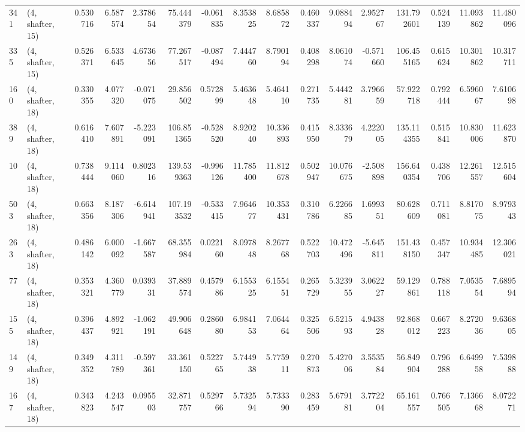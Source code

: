 \begin{tabular}{llrrrrrrrrrrrrrr}
341 &  (4, shafter, 15) &   0.530716 &   6.587574 &   2.378654 &    75.444379 &  -0.061835 &   8.353825 &   8.685872 &  0.460337 &   9.088494 &   2.952767 &   131.792601 &  0.524139 &  11.093862 &  11.480096 \\
335 &  (4, shafter, 15) &   0.526371 &   6.533645 &   4.673656 &    77.267517 &  -0.087494 &   7.444760 &   8.790194 &  0.408298 &   8.061074 &  -0.571660 &   106.455165 &  0.615624 &  10.301862 &  10.317711 \\
160 &  (4, shafter, 18) &   0.330355 &   4.077320 &  -0.071075 &    29.856502 &   0.572899 &   5.463648 &   5.464110 &  0.271735 &   5.444281 &   3.796659 &    57.922718 &  0.792444 &   6.596067 &   7.610698 \\
389 &  (4, shafter, 18) &   0.616410 &   7.607891 &  -5.223091 &   106.851365 &  -0.528520 &   8.920240 &  10.336893 &  0.415950 &   8.333679 &   4.222005 &   135.114355 &  0.515841 &  10.830006 &  11.623870 \\
10  &  (4, shafter, 18) &   0.738444 &   9.114060 &   0.802316 &   139.539363 &  -0.996126 &  11.785400 &  11.812678 &  0.502947 &  10.076675 &  -2.508898 &   156.640354 &  0.438706 &  12.261557 &  12.515604 \\
503 &  (4, shafter, 18) &   0.663356 &   8.187306 &  -6.614941 &   107.193532 &  -0.533415 &   7.964677 &  10.353431 &  0.310786 &   6.226685 &   1.699351 &    80.628609 &  0.711081 &   8.817075 &   8.979343 \\
263 &  (4, shafter, 18) &   0.486142 &   6.000092 &  -1.667587 &    68.355984 &   0.022160 &   8.097848 &   8.267768 &  0.522703 &  10.472496 &  -5.645811 &   151.438150 &  0.457347 &  10.934485 &  12.306021 \\
77  &  (4, shafter, 18) &   0.353321 &   4.360779 &   0.039331 &    37.889574 &   0.457986 &   6.155325 &   6.155451 &  0.265729 &   5.323955 &   3.062227 &    59.129861 &  0.788118 &   7.053554 &   7.689594 \\
155 &  (4, shafter, 18) &   0.396437 &   4.892921 &  -1.062191 &    49.906648 &   0.286080 &   6.984153 &   7.064464 &  0.325506 &   6.521593 &   4.943828 &    92.868012 &  0.667223 &   8.272036 &   9.636805 \\
149 &  (4, shafter, 18) &   0.349352 &   4.311789 &  -0.597361 &    33.361150 &   0.522765 &   5.744938 &   5.775911 &  0.270873 &   5.427006 &   3.553584 &    56.849904 &  0.796288 &   6.649958 &   7.539888 \\
167 &  (4, shafter, 18) &   0.343823 &   4.243547 &   0.095503 &    32.871757 &   0.529766 &   5.732594 &   5.733390 &  0.283459 &   5.679181 &   3.772204 &    65.161557 &  0.766505 &   7.136668 &   8.072271 \\

\end{tabular}
